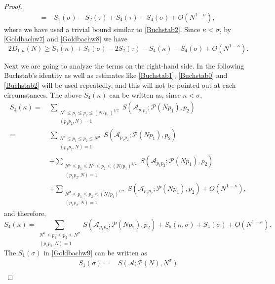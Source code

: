 \documentclass[12pt, a4paper]{amsart}
\def\le{\leqslant}
\def\ge{\geqslant}
\theoremstyle{plain}
\theoremstyle{remark}
\numberwithin{equation}{section}
\begin{document}
\begin{proof}
\begin{equation}
\begin{split}
=\ &S_1(\sigma)-S_2(\tau)+S_4(\tau)-S_4(\sigma)+O(N^{1-\sigma}),
\end{split}	
\end{equation}
where we have used a trivial bound similar to \eqref{Buchstab2}.  
Since $\kappa<\sigma$, by \eqref{Goldbachw7} and \eqref{Goldbachw8} we have
		\begin{equation}\label{Goldbachw9}
2D_{1,a}(N)\ge S_1(\kappa)+S_1(\sigma)-2S_2(\tau)-S_4(\kappa)-S_4(\sigma)+O(N^{1-\kappa}).
		\end{equation}

Next we are going to analyze the terms on the right-hand side. In the following Buchstab's identity as well as 
estimates like \eqref{Buchstab1}, \eqref{Buchstab0} and \eqref{Buchstab2} will be used repeatedly, and this will not be 
pointed out at each circumstances.  The above $S_4(\kappa)$ can be written as, since $\kappa<\sigma$,  
\begin{equation*}
\begin{split}
S_4(\kappa)
=\ &\sum_{\substack{N^\kappa \le p_1 \le p_2 \le (N/p_1)^{1/2} \\ (p_1 p_2, N) = 1}}  S(\mathscr{A}_{p_1 p_2}; \mathscr{P}(N p_1), p_2)\\ 
=\ &\sum_{\substack{N^\kappa \le p_1 \le p_2 \le N^\sigma \\ (p_1 p_2, N) = 1}}  S(\mathscr{A}_{p_1 p_2}; \mathscr{P}(N p_1), p_2)\\
&+\sum_{\substack{N^\kappa \le p_1 \le N^\sigma\le p_2 \le (N/p_1)^{1/2} \\ (p_1 p_2, N) = 1}}  S(\mathscr{A}_{p_1 p_2}; \mathscr{P}(N p_1), p_2)\\
&+\sum_{\substack{N^\sigma \le p_1 \le p_2 \le (N/p_1)^{1/2} \\ (p_1 p_2, N) = 1}}  S(\mathscr{A}_{p_1 p_2}; \mathscr{P}(N p_1), p_2)+O(N^{1-\kappa}), 
\end{split}
\end{equation*}
and therefore, 
\begin{equation}\label{Goldbachw10}
S_4(\kappa)
=\sum_{\substack{N^\kappa \le p_1 \le p_2 \le N^\sigma \\ (p_1 p_2, N) = 1}}  S(\mathscr{A}_{p_1 p_2}; \mathscr{P}(N p_1), p_2)+S_5(\kappa,\sigma)+S_4(\sigma)+O(N^{1-\kappa}). 
\end{equation}
The $S_1(\sigma)$ in \eqref{Goldbachw9} can be written as 
\begin{equation*}
\begin{split}
S_1(\sigma)=\ &S(\mathscr{A};\mathscr{P}(N),N^\sigma)\\

\end{split}
\end{equation*}
\end{proof}
\end{document}
